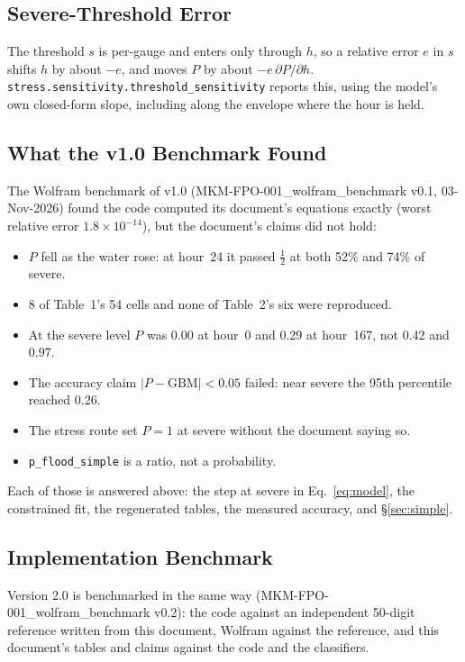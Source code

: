 \documentclass[11pt,a4paper]{article}
\begin{document}
\subsection{Severe-Threshold Error}
The threshold $s$ is per-gauge and enters only through $h$, so a relative error $e$
in $s$ shifts $h$ by about $-e$, and moves $P$ by about $-e\,\partial P/\partial h$.
\texttt{stress.sensitivity.threshold\_sensitivity} reports this, using the model's own
closed-form slope, including along the envelope where the hour is held.

\mkmvalidation

\subsection{What the v1.0 Benchmark Found}
The Wolfram benchmark of v1.0 (MKM-FPO-001\_wolfram\_benchmark v0.1, 03-Nov-2026) found
the code computed its document's equations exactly (worst relative error
$1.8\times10^{-14}$), but the document's claims did not hold:
\begin{itemize}[nosep]
    \item $P$ fell as the water rose: at hour~24 it passed $\tfrac12$ at both 52\% and
          74\% of severe.
    \item 8 of Table~1's 54 cells and none of Table~2's six were reproduced.
    \item At the severe level $P$ was 0.00 at hour~0 and 0.29 at hour~167, not 0.42
          and 0.97.
    \item The accuracy claim $|P-\text{GBM}|<0.05$ failed: near severe the 95th
          percentile reached 0.26.
    \item The stress route set $P=1$ at severe without the document saying so.
    \item \texttt{p\_flood\_simple} is a ratio, not a probability.
\end{itemize}
Each of those is answered above: the step at severe in Eq.~\eqref{eq:model}, the
constrained fit, the regenerated tables, the measured accuracy, and \S\ref{sec:simple}.

\subsection{Implementation Benchmark}
Version 2.0 is benchmarked in the same way (MKM-FPO-001\_wolfram\_benchmark v0.2):
the code against an independent 50-digit reference written from this document, Wolfram
against the reference, and this document's tables and claims against the code and the
classifiers.
\end{document}
